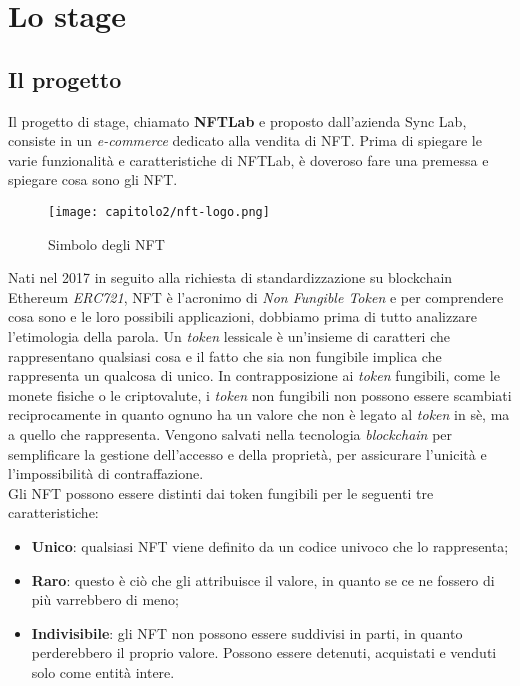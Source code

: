 
\chapter{Lo stage}
\label{cap:stage}


\section{Il progetto}
Il progetto di stage, chiamato \textbf{NFTLab} e proposto dall'azienda Sync Lab, consiste in un \textit{e-commerce} dedicato alla vendita di NFT. Prima di spiegare le varie funzionalità e caratteristiche di NFTLab, è doveroso fare una premessa e spiegare cosa sono gli NFT. \\

\begin{figure}[!h]
  \centering
  \texttt{[image: capitolo2/nft-logo.png]}
  \caption{Simbolo degli NFT}
\end{figure}

Nati nel 2017 in seguito alla richiesta di standardizzazione su blockchain Ethereum \textit{ERC721}, NFT è l'acronimo di \textit{Non Fungible Token} e per comprendere cosa sono e le loro possibili applicazioni, dobbiamo prima di tutto analizzare l'etimologia della parola.
Un \textit{token} lessicale è un'insieme di caratteri che rappresentano qualsiasi cosa e il fatto che sia non fungibile implica che rappresenta un qualcosa di unico.
In contrapposizione ai \textit{token} fungibili, come le monete fisiche o le \gls{criptovalute}, i \textit{token} non fungibili non possono essere scambiati reciprocamente in quanto ognuno ha un valore che non è legato al \textit{token} in sè, ma a quello che rappresenta.
Vengono salvati nella tecnologia \textit{blockchain} per semplificare la gestione dell'accesso e della proprietà, per assicurare l'unicità e l'impossibilità di contraffazione. \\

\noindent Gli NFT possono essere distinti dai token fungibili per le seguenti tre caratteristiche:
\begin{itemize}
  \item \textbf{Unico}: qualsiasi NFT viene definito da un codice univoco che lo rappresenta;
  \item \textbf{Raro}: questo è ciò che gli attribuisce il valore, in quanto se ce ne fossero di più varrebbero di meno;
  \item \textbf{Indivisibile}: gli NFT non possono essere suddivisi in parti, in quanto perderebbero il proprio valore. Possono essere detenuti, acquistati e venduti solo come entità intere.
\end{itemize}

